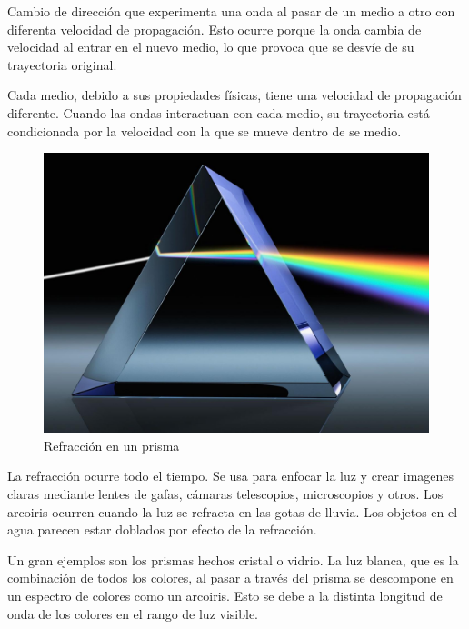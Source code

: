 Cambio de dirección que experimenta una onda al pasar de un medio a otro con diferenta velocidad de propagación. Esto ocurre porque la onda cambia de velocidad al entrar en el nuevo medio, lo que provoca que se desvíe de su trayectoria original.

Cada medio, debido a sus propiedades físicas, tiene una velocidad de propagación diferente. Cuando las ondas interactuan con cada medio, su trayectoria está condicionada por la velocidad con la que se mueve dentro de se medio\cite{sncrfrlight}.

\begin{figure}
  \centering
  \includegraphics[scale=0.5]{imagenes/prisma.png}
  \caption{Refracción en un prisma\cite{cstmglassprism}}
\end{figure}

La refracción ocurre todo el tiempo. Se usa para enfocar la luz y crear imagenes claras mediante lentes de gafas, cámaras telescopios, microscopios y otros. Los arcoiris ocurren cuando la luz se refracta en las gotas de lluvia. Los objetos en el agua parecen estar doblados por efecto de la refracción.

Un gran ejemplos son los prismas hechos cristal o vidrio. La luz blanca, que es la combinación de todos los colores, al pasar a través del prisma se descompone en un espectro de colores como un arcoiris. Esto se debe a la distinta longitud de onda de los colores en el rango de luz visible.
